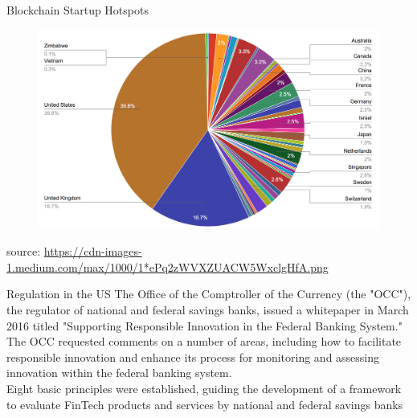 \documentclass[11pt]{beamer}
\begin{document}
\begin{frame}{Blockchain Startup Hotspots}
	\begin{figure}[]
		\centering
		\includegraphics  [scale=0.2]{Images/startups}
	\end{figure}
	\begin{scriptsize}
		source: \href{https://medium.com/outlier-ventures-io/5-things-we-learned-from-analysing-the-location-of-950-blockchain-startups-96daa788560c}{https://cdn-images-1.medium.com/max/1000/1*ePq2zWVXZUACW5WxclgHfA.png}
	\end{scriptsize}
\end{frame}


\begin{frame}{Regulation in the US}
	The Office of the Comptroller of the Currency (the "OCC"), the regulator of national and federal savings banks, issued a whitepaper in March 2016 titled "Supporting Responsible Innovation in the Federal Banking System." \\ \vspace{3mm}
	The OCC requested comments on a number of areas, including how to facilitate responsible innovation and enhance its process for monitoring and assessing innovation within the federal banking system. \\ \vspace{3mm}
	Eight basic principles were established, guiding the development of a framework to evaluate FinTech products and services by national and federal savings banks
\end{frame}

\end{document}
